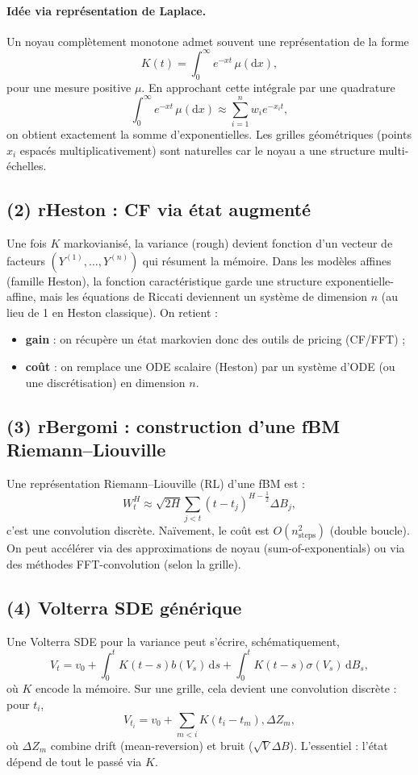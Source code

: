 \documentclass[11pt,a4paper]{report}
\theoremstyle{definition}
\theoremstyle{plain}
\theoremstyle{remark}
\newcommand{\dd}{\mathrm{d}}
\newcommand{\1}{\mathbf{1}}
\begin{document}
\paragraph{Idée via représentation de Laplace.}
Un noyau complètement monotone admet souvent une représentation de la forme
\[
K(t)=\int_0^{\infty} e^{-xt}\,\mu(\dd x),
\]
pour une mesure positive $\mu$. En approchant cette intégrale par une quadrature
\[
\int_0^\infty e^{-xt}\,\mu(\dd x)\approx \sum_{i=1}^n w_i e^{-x_i t},
\]
on obtient exactement la somme d'exponentielles. Les grilles géométriques (points $x_i$ espacés multiplicativement) sont naturelles car le noyau a une structure multi-échelles.

\subsection*{(2) rHeston : CF via état augmenté}
Une fois $K$ markovianisé, la variance (rough) devient fonction d'un vecteur de facteurs $(Y^{(1)},\ldots,Y^{(n)})$ qui résument la mémoire.
Dans les modèles affines (famille Heston), la fonction caractéristique garde une structure exponentielle-affine, mais les équations de Riccati deviennent un système de dimension $n$ (au lieu de 1 en Heston classique).
On retient :
\begin{itemize}[leftmargin=*]
\item \textbf{gain} : on récupère un état markovien donc des outils de pricing (CF/FFT) ;
\item \textbf{coût} : on remplace une ODE scalaire (Heston) par un système d'ODE (ou une discrétisation) en dimension $n$.
\end{itemize}

\subsection*{(3) rBergomi : construction d'une fBM Riemann--Liouville}
Une représentation Riemann--Liouville (RL) d'une fBM est :
\[
W_t^H \approx \sqrt{2H}\sum_{j<t} (t-t_j)^{H-\frac12}\Delta B_j,
\]
c'est une convolution discrète. Naïvement, le coût est $O(n_{\text{steps}}^2)$ (double boucle).
On peut accélérer via des approximations de noyau (sum-of-exponentials) ou via des méthodes FFT-convolution (selon la grille).

\subsection*{(4) Volterra SDE générique}
Une Volterra SDE pour la variance peut s'écrire, schématiquement,
\[
V_t=v_0+\int_0^t K(t-s)b(V_s)\,\dd s+\int_0^t K(t-s)\sigma(V_s)\,\dd B_s,
\]
où $K$ encode la mémoire. Sur une grille, cela devient une convolution discrète : pour $t_i$,
\[
V_{t_i}=v_0+\sum_{m<i} K(t_i-t_m),\Delta Z_m,
\]
où $\Delta Z_m$ combine drift (mean-reversion) et bruit ($\sqrt{V}\Delta B$). L'essentiel : l'état dépend de tout le passé via $K$.
\end{document}
